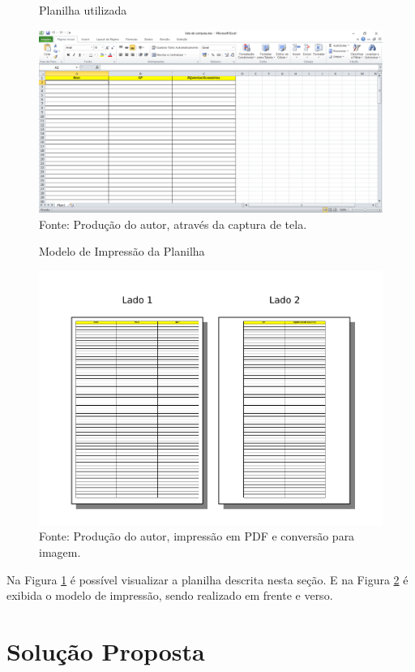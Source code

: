 \documentclass[
	draft,
	12pt,
	openright,
	oneside, %
	a4paper,
	chapter=TITLE,
	section=TITLE,
	english,
	brazil %
	]{abntex2-udesc}
\begin{document}
\begin{figure}[h]
\caption{Planilha utilizada}\label{fig:planilha}
\centering
\includegraphics[width=\textwidth,keepaspectratio]{figures/lista-excel.pdf}
\caption*{\footnotesize Fonte: Produção do autor, através da captura de tela.}
\end{figure}

\begin{figure}[h]
\caption{Modelo de Impressão da Planilha}\label{fig:impressao}
\centering
\includegraphics[width=\textwidth,keepaspectratio]{figures/modelo-impressao.pdf}
\caption*{\footnotesize Fonte: Produção do autor, impressão em PDF e conversão para imagem.}
\end{figure}


Na Figura \ref{fig:planilha} é possível visualizar a planilha descrita nesta seção. E na Figura \ref{fig:impressao} é exibida o modelo de impressão, sendo realizado em frente e verso.

\chapter{Solução Proposta}
\end{document}
